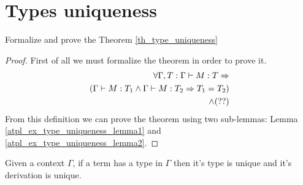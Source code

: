 \documentclass[12pt,a4paper,oneside]{book}
\begin{document}
\section{Types uniqueness}

\begin{exercise}
    Formalize and prove the Theorem \ref{th_type_uniqueness}

    \begin{proof}
        First of all we must formalize the theorem in order to prove it.
        \begin{align*}
            \forall \Gamma, T \mathrel{:} \Gamma \vdash M : T \Rightarrow \\
            (\Gamma \vdash M : T_1 \land \Gamma \vdash M : T_2 \Rightarrow T_1 = T_2) \\
            \land (??)
        \end{align*}
        From this definition we can prove the theorem using two sub-lemmas: Lemma \ref{atpl_ex_type_uniqueness_lemma1} and \ref{atpl_ex_type_uniqueness_lemma2}.
    \end{proof}
\end{exercise}

\begin{theorem}
    \label{th_type_uniqueness}
    Given a context $\Gamma$, if a term has a type in $\Gamma$ then it's type is unique and it's derivation is unique.
\end{theorem}
\end{document}
